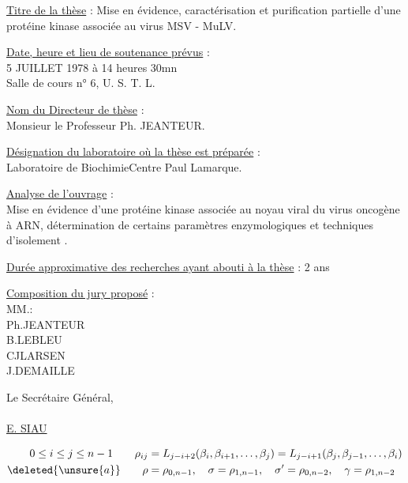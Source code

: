 \uline{Titre de la thèse} : Mise en évidence, caractérisation et purification partielle d'une protéine kinase associée au virus MSV - MuLV.

\uline{Date, heure et lieu de soutenance prévus} :\\
5 JUILLET 1978 à 14 heures 30mn\\
Salle de cours n° 6, U. S. T. L.

\uline{Nom du Directeur de thèse} :\\
Monsieur le Professeur Ph. JEANTEUR.

\uline{Désignation du laboratoire où la thèse est préparée} :\\
Laboratoire de Biochimie\quad Centre Paul Lamarque.

\uline{Analyse de l'ouvrage} :\\
Mise en évidence d'une protéine kinase associée au noyau viral du virus oncogène à ARN, détermination de certains paramètres enzymologiques et techniques d'isolement .

\uline{Durée approximative des recherches ayant abouti à la thèse} : 2 ans

\uline{Composition du jury proposé} :\\
MM.\qquad :\\
Ph.\quad JEANTEUR\\
B.\quad LEBLEU\\
CJ\quad LARSEN\\
J.\quad DEMAILLE

Le Secrétaire Général,\\

\\

\uline{E. SIAU}


\[
\begin{aligned}
0\le i\le j\le n-1\qquad \rho_{ij}&=L_{j-i+2}(\beta_i,\beta_{i+1},\ldots,\beta_j)=L_{j-i+1}(\beta_j,\beta_{j-1},\ldots,\beta_i)\\
\deleted{\unsure{a}}\qquad \rho&=\rho_{0,n-1},\quad \sigma=\rho_{1,n-1},\quad \sigma'=\rho_{0,n-2},\quad \gamma=\rho_{1,n-2}
\end{aligned}
\]

